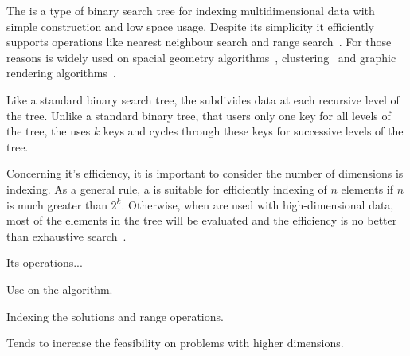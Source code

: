 The \kdtree{} is a type of binary search tree for indexing multidimensional
data with simple construction and low space usage.
Despite its simplicity it efficiently supports operations like nearest
neighbour search and range search~\cite{bentley1975}.
For those reasons \kdtree{} is widely used on
spacial geometry algorithms~\cite{preparata2012computational, guttman1984r}, 
clustering~\cite{kanungo2002efficient, indyk1998approximate}
and graphic rendering algorithms~\cite{owens2007survey}.

Like a standard binary search tree, the \kdtree{} subdivides data at each
recursive level of the tree.
Unlike a standard binary tree, that users only one key for all levels of the tree,
the \kdtree{} uses $k$ keys and cycles through these keys for successive levels
of the tree.


Concerning it's efficiency, it is important to consider the number of dimensions
\kdtree{} is indexing.
As a general rule, a \kdtree{} is suitable for efficiently indexing of $n$ elements
if $n$ is much greater than $2^k$.
Otherwise, when \kdtree{} are used with high-dimensional data, most of the elements
in the tree will be evaluated and the efficiency is no better than exhaustive search~\cite{toth2004handbook}.

Its operations...

Use on the algorithm.

Indexing the solutions and range operations.

Tends to increase the feasibility on problems with higher dimensions.
